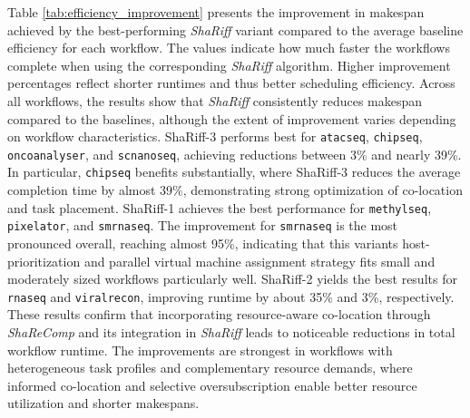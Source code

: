 \noindent
Table \ref{tab:efficiency_improvement} presents the improvement in makespan achieved by the best-performing \textit{ShaRiff} variant compared to the average baseline efficiency for each workflow. The values indicate how much faster the workflows complete when using the corresponding \textit{ShaRiff} algorithm. Higher improvement percentages reflect shorter runtimes and thus better scheduling efficiency.
Across all workflows, the results show that \textit{ShaRiff} consistently reduces makespan compared to the baselines, although the extent of improvement varies depending on workflow characteristics. ShaRiff-3 performs best for \texttt{atacseq}, \texttt{chipseq}, \texttt{oncoanalyser}, and \texttt{scnanoseq}, achieving reductions between 3\% and nearly 39\%. In particular, \texttt{chipseq} benefits substantially, where ShaRiff-3 reduces the average completion time by almost 39\%, demonstrating strong optimization of co-location and task placement.
ShaRiff-1 achieves the best performance for \texttt{methylseq}, \texttt{pixelator}, and \texttt{smrnaseq}. The improvement for \texttt{smrnaseq} is the most pronounced overall, reaching almost 95\%, indicating that this variants host-prioritization and parallel virtual machine assignment strategy fits small and moderately sized workflows particularly well. ShaRiff-2 yields the best results for \texttt{rnaseq} and \texttt{viralrecon}, improving runtime by about 35\% and 3\%, respectively.
These results confirm that incorporating resource-aware co-location through \textit{ShaReComp} and its integration in \textit{ShaRiff} leads to noticeable reductions in total workflow runtime. The improvements are strongest in workflows with heterogeneous task profiles and complementary resource demands, where informed co-location and selective oversubscription enable better resource utilization and shorter makespans.

